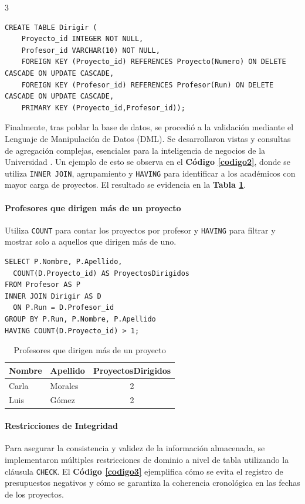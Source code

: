 \documentclass[a0,portrait]{a0poster}
\begin{document}
\begin{multicols}{3}
\begin{lstlisting}[caption=Creación de Tablas en SQL,label=codigo1]
CREATE TABLE Dirigir (
    Proyecto_id INTEGER NOT NULL,
    Profesor_id VARCHAR(10) NOT NULL,
    FOREIGN KEY (Proyecto_id) REFERENCES Proyecto(Numero) ON DELETE CASCADE ON UPDATE CASCADE,
    FOREIGN KEY (Profesor_id) REFERENCES Profesor(Run) ON DELETE CASCADE ON UPDATE CASCADE,
    PRIMARY KEY (Proyecto_id,Profesor_id));
\end{lstlisting}

Finalmente, tras poblar la base de datos, se procedió a la validación mediante el Lenguaje de Manipulación de Datos (DML). Se desarrollaron vistas y consultas de agregación complejas, esenciales para la inteligencia de negocios de la Universidad \cite{ramakrishnan2003database}. Un ejemplo de esto se observa en el \textbf{Código \ref{codigo2}}, donde se utiliza \texttt{INNER JOIN}, agrupamiento y \texttt{HAVING} para identificar a los académicos con mayor carga de proyectos. El resultado se evidencia en la \textbf{Tabla \ref{tabla1}}.





\paragraph*{Profesores que dirigen más de un proyecto}Utiliza \texttt{COUNT} para contar los proyectos por profesor y \texttt{HAVING} para filtrar y mostrar solo a aquellos que dirigen más de uno.
\begin{lstlisting}[caption=Profesores que dirigen más de un proyecto, label=codigo2]
SELECT P.Nombre, P.Apellido,
  COUNT(D.Proyecto_id) AS ProyectosDirigidos
FROM Profesor AS P
INNER JOIN Dirigir AS D
  ON P.Run = D.Profesor_id
GROUP BY P.Run, P.Nombre, P.Apellido
HAVING COUNT(D.Proyecto_id) > 1;
\end{lstlisting}


\begin{table}\centering
\begin{tabular}{|l|l|c|}
\hline
\textbf{Nombre} & \textbf{Apellido} & \textbf{ProyectosDirigidos} \\ \hline
Carla & Morales & 2 \\ \hline
Luis & Gómez & 2 \\ \hline
\end{tabular}
\caption{Profesores que dirigen más de un proyecto}
\label{tabla1}
\end{table}


\paragraph*{Restricciones de Integridad}
Para asegurar la consistencia y validez de la información almacenada, se implementaron múltiples restricciones de dominio a nivel de tabla utilizando la cláusula \texttt{CHECK}. El \textbf{Código \ref{codigo3}} ejemplifica cómo se evita el registro de presupuestos negativos y cómo se garantiza la coherencia cronológica en las fechas de los proyectos.


\end{multicols}
\end{document}
